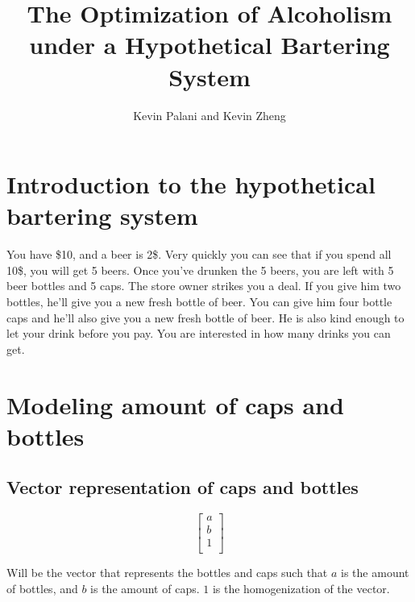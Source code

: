 \documentclass[letterpaper, 12pt]{article}
\title{The Optimization of Alcoholism under a Hypothetical Bartering System}
\author{Kevin Palani and Kevin Zheng}
\begin{document}
\maketitle
\tableofcontents
\section{Introduction to the hypothetical bartering system}
\par You have \$10, and a beer is 2\$.
Very quickly you can see that if you spend all 10\$, you will get 5 beers.
Once you've drunken the 5 beers, you are left with 5 beer bottles and 5 caps.
The store owner strikes you a deal.
If you give him two bottles, he'll give you a new fresh bottle of beer.
You can give him four bottle caps and he'll also give you a new fresh bottle of beer.
He is also kind enough to let your drink before you pay.
You are interested in how many drinks you can get.
\section{Modeling amount of caps and bottles}
\subsection{Vector representation of caps and bottles}
\[
	\begin{bmatrix}
		a\\
		b\\
		1\\
	\end{bmatrix}
\]
\par Will be the vector that represents the bottles and caps such that $a$ is the amount of bottles, and $b$ is the amount of caps.
$1$ is the homogenization of the vector.
\end{document}
